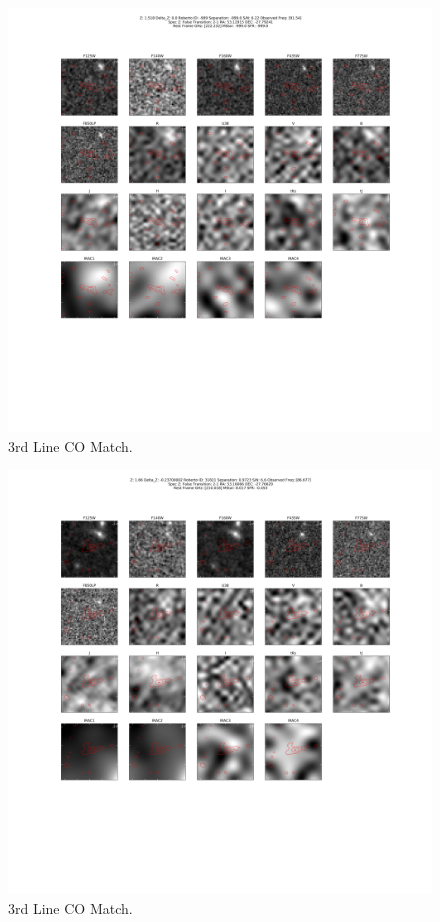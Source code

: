 \begin{figure}[tbp]
\centering \includegraphics[width=120mm]{Matched/ASPECS_Cutout_11.png}
\caption{3rd Line CO Match.}
\label{fig:Match_Three}
\end{figure}

\begin{figure}[tbp]
\centering \includegraphics[width=120mm]{Matched/ASPECS_Cutout_12.png}
\caption{3rd Line CO Match.}
\label{fig:Match_Three}
\end{figure}

